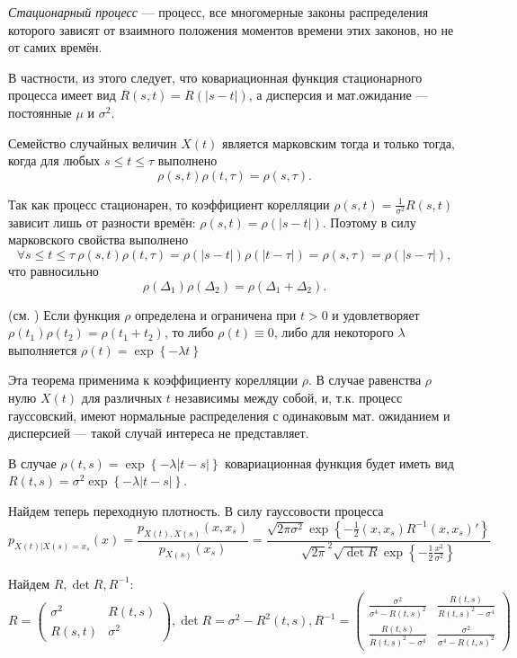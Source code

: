 \documentclass[12pt, a4paper]{article}
\begin{document}
\begin{df}
\textit{Стационарный процесс} --- процесс, все многомерные законы распределения которого зависят от взаимного положения моментов времени этих законов, но не от самих времён.
\end{df}
В частности, из этого следует, что ковариационная функция стационарного процесса имеет вид $R(s,t)=R(|s-t|)$, а дисперсия и мат.ожидание --- постоянные $\mu$ и $\sigma^2$.

\begin{theorem}
Семейство случайных величин $X(t)$ является марковским тогда и только тогда, когда для любых $s\leqslant t \leqslant \tau$ выполнено 
\[ \rho(s,t)\rho(t,\tau) = \rho(s,\tau). \]
\end{theorem}

Так как процесс стационарен, то коэффициент корелляции $\rho(s,t) = \frac 1 {\sigma^2} R(s,t)$ зависит лишь от разности времён: $\rho(s,t)=\rho(\left|s-t\right|)$. Поэтому в силу марковского свойства выполнено
\[ \forall s\leqslant t \leqslant \tau \ \rho(s,t)\rho(t,\tau) = \rho(|s-t|)\rho(|t-\tau|) = \rho(s,\tau) = \rho(|s-\tau|),\]
что равносильно
\[ \rho(\Delta_1)\rho(\Delta_2) = \rho(\Delta_1+\Delta_2). \]

\begin{theorem}(см. \cite{feller})
Если функция $\rho$ определена и ограничена при $t>0$ и удовлетворяет $\rho(t_1)\rho(t_2) = \rho(t_1+t_2) $, то либо $\rho(t)\equiv 0$, либо для некоторого $\lambda$ выполняется $\rho(t)=\exp\left\{ -\lambda t \right\}$
\end{theorem}

Эта теорема применима к коэффициенту корелляции $\rho$. В случае равенства $\rho$ нулю $X(t)$ для различных $t$ независимы между собой, и, т.к. процесс гауссовский, имеют нормальные распределения с одинаковым мат. ожиданием и дисперсией --- такой случай интереса не представляет.

В случае $\rho(t,s) = \exp\left\{ -\lambda |t-s| \right\}$ ковариационная функция будет иметь вид $R(t,s)=\sigma^2\exp\left\{ -\lambda |t-s| \right\}$. 

Найдем теперь переходную плотность. В силу гауссовости процесса
\[ p_{X(t)|X(s)=x_s}(x) = \frac{p_{X(t),X(s)}(x,x_s)}{p_{X(s)}(x_s)} = 
\frac{\sqrt{2\pi\sigma^2} \exp\left\{ -\frac 12 (x,x_s)R^{-1}(x,x_s)' \right\}}
	{\sqrt{2\pi}^2\sqrt{\det R} \exp\left\{ -\frac 12 \frac{x^2}{\sigma^2} \right\}} \]
	
Найдем $R,\det R, R^{-1}$:
\[ R = \begin{pmatrix}
		\sigma^2 & R(t,s) \\
		R(s,t) & \sigma^2
	\end{pmatrix}, \det{R} = \sigma^2 - R^2(t,s),
	R^{-1} = 
	\left(
	\begin{array}{cc}
	 \frac{\sigma ^2}{\sigma ^4-R(t,s)^2} & \frac{R(t,s)}{R(t,s)^2-\sigma ^4}
	   \\
	 \frac{R(t,s)}{R(t,s)^2-\sigma ^4} & \frac{\sigma ^2}{\sigma ^4-R(t,s)^2}
	\end{array}
	\right)
	 \]
	 
\end{document}

